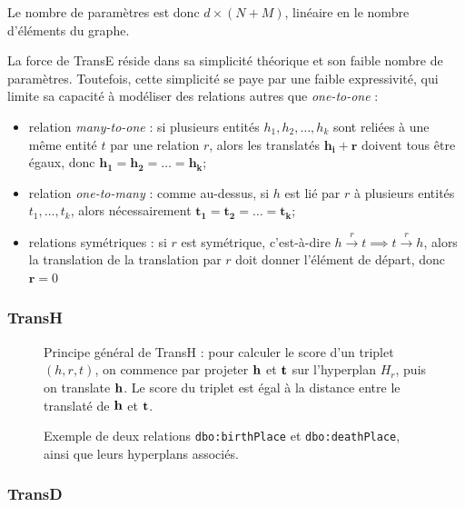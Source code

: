 Le nombre de paramètres est donc $d \times (N + M)$, linéaire en le nombre d'éléments du graphe. 

La force de TransE réside dans sa simplicité théorique et son faible nombre de paramètres. Toutefois, cette simplicité se paye par une faible expressivité, qui limite sa capacité à modéliser des relations autres que \textit{one-to-one} :
\begin{itemize}
    \item relation \textit{many-to-one} : si plusieurs entités $h_1, h_2, \ldots, h_k$ sont reliées à une même entité $t$ par une relation $r$, alors les translatés $\mathbf{h_i + r}$ doivent tous être égaux, donc $\mathbf{h_1  = h_2 = \ldots = h_k}$;
    \item relation \textit{one-to-many} : comme au-dessus, si $h$ est lié par $r$ à plusieurs entités $t_1, \ldots, t_k$, alors nécessairement $\mathbf{t_1 = t_2 = \ldots = t_k}$;
    \item relations symétriques : si $r$ est symétrique, c'est-à-dire $h  \overset{r} \rightarrow t \implies t   \overset{r} \rightarrow h$, alors la translation de la translation par $r$ doit donner l'élément de départ, donc $\mathbf{r} = 0$
\end{itemize}

\subsubsection{TransH \cite{fu2014learning}}

\begin{figure}[hbt]
    \centering
    
    \caption[Principe général de TransH]{Principe général de TransH : pour calculer le score d'un triplet $(h, r, t)$, on commence par projeter $\bf{h}$ et $\bf{t}$ sur l'hyperplan $H_r$, puis on translate $\bf{h}$. Le score du triplet est égal à la distance entre le translaté de $\bf{h}$ et $\bf{t}$.}
    \label{fig:transh}
\end{figure}

\begin{figure}[hbt]
    \centering
    
    \caption[Exemple des possibilités laissées par TransH]{Exemple de deux relations \texttt{dbo:birthPlace} et \texttt{dbo:deathPlace}, ainsi que leurs hyperplans associés.}
    \label{fig:transh-dual}
\end{figure}

\subsubsection{TransD}

